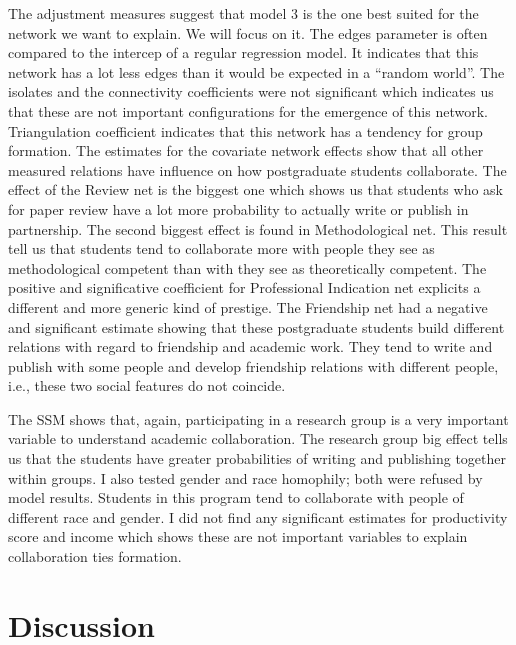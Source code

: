 \documentclass[12pt, english]{article}
\begin{document}
\begin{table}[!h]
\end{table}

The adjustment measures suggest that model 3 is the one best suited for the network we want to explain. We will focus on it. The edges parameter is often compared to the intercep of a regular regression model. It indicates that this network has a lot less edges than it would be expected in a ``random world''. The isolates and the connectivity coefficients were not significant which indicates us that these are not important configurations for the emergence of this network. Triangulation coefficient indicates that this network has a tendency for group formation. The estimates for the covariate network effects show that all other measured relations have influence on how postgraduate students collaborate. The effect of the Review net is the biggest one which shows us that students who ask for paper review have a lot more probability to actually write or publish in partnership. The second biggest effect is found in Methodological net. This result tell us that students tend to collaborate more with people they see as methodological competent than with they see as theoretically competent. The positive and significative coefficient for Professional Indication net explicits a different and more generic kind of prestige. The Friendship net had a negative and significant estimate showing that these postgraduate students build different relations with regard to friendship and academic work. They tend to write and publish with some people and develop friendship relations with different people, i.e., these two social features do not coincide.

The SSM shows that, again, participating in a research group is a very important variable to understand academic collaboration. The research group big effect tells us that the students have greater probabilities of writing and publishing together within groups. I also tested gender and race homophily; both were refused by model results. Students in this program tend to collaborate with people of different race and gender. I did not find any significant estimates for productivity score and income which shows these are not important variables to explain collaboration ties formation.


\section{Discussion}
\end{document}
